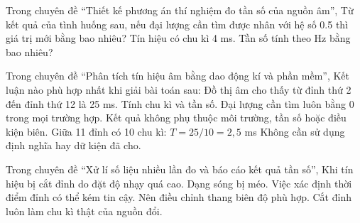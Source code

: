 \begin{ex}
Trong chuyên đề “Thiết kế phương án thí nghiệm đo tần số của nguồn âm”, Từ kết quả của tình huống sau, nếu đại lượng cần tìm được nhân với hệ số 0.5 thì giá trị mới bằng bao nhiêu? Tín hiệu có chu kì 4 ms. Tần số tính theo Hz bằng bao nhiêu?
\end{ex}

\begin{ex}
Trong chuyên đề “Phân tích tín hiệu âm bằng dao động kí và phần mềm”, Kết luận nào phù hợp nhất khi giải bài toán sau: Đồ thị âm cho thấy từ đỉnh thứ 2 đến đỉnh thứ 12 là 25 ms. Tính chu kì và tần số.
\choice
{Đại lượng cần tìm luôn bằng 0 trong mọi trường hợp.}
{Kết quả không phụ thuộc môi trường, tần số hoặc điều kiện biên.}
{\True Giữa 11 đỉnh có 10 chu kì: $T=25/10=2,5$ ms}
{Không cần sử dụng định nghĩa hay dữ kiện đã cho.}
\end{ex}

\begin{ex}
Trong chuyên đề “Xử lí số liệu nhiều lần đo và báo cáo kết quả tần số”, Khi tín hiệu bị cắt đỉnh do đặt độ nhạy quá cao.
\choiceTF
{\True Dạng sóng bị méo.}
{\True Việc xác định thời điểm đỉnh có thể kém tin cậy.}
{\True Nên điều chỉnh thang biên độ phù hợp.}
{Cắt đỉnh luôn làm chu kì thật của nguồn đổi.}
\end{ex}

